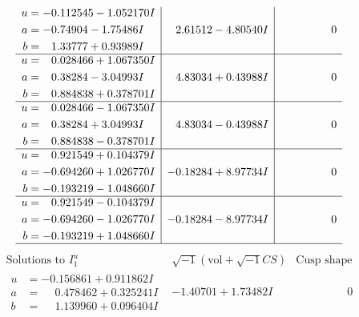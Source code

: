 \documentclass[1p]{elsarticle_modified}
\theoremstyle{definition}
\newcommand{\I}{\sqrt{-1}}
\begin{document}
$$\begin{array}{c|c|c}
\begin{aligned}
u &= -0.112545 - 1.052170 I \\
a &= -0.74904 - 1.75486 I \\
b &= \phantom{-}1.33777 + 0.93989 I\end{aligned}
 & \phantom{-}2.61512 - 4.80540 I & \phantom{-0.000000 } 0 \\ \hline\begin{aligned}
u &= \phantom{-}0.028466 + 1.067350 I \\
a &= \phantom{-}0.38284 - 3.04993 I \\
b &= \phantom{-}0.884838 + 0.378701 I\end{aligned}
 & \phantom{-}4.83034 + 0.43988 I & \phantom{-0.000000 } 0 \\ \hline\begin{aligned}
u &= \phantom{-}0.028466 - 1.067350 I \\
a &= \phantom{-}0.38284 + 3.04993 I \\
b &= \phantom{-}0.884838 - 0.378701 I\end{aligned}
 & \phantom{-}4.83034 - 0.43988 I & \phantom{-0.000000 } 0 \\ \hline\begin{aligned}
u &= \phantom{-}0.921549 + 0.104379 I \\
a &= -0.694260 + 1.026770 I \\
b &= -0.193219 - 1.048660 I\end{aligned}
 & -0.18284 + 8.97734 I & \phantom{-0.000000 } 0 \\ \hline\begin{aligned}
u &= \phantom{-}0.921549 - 0.104379 I \\
a &= -0.694260 - 1.026770 I \\
b &= -0.193219 + 1.048660 I\end{aligned}
 & -0.18284 - 8.97734 I & \phantom{-0.000000 } 0\\
 \hline 
 \end{array}$$\newpage$$\begin{array}{c|c|c}  
\text{Solutions to }I^u_{1}& \I (\text{vol} + \sqrt{-1}CS) & \text{Cusp shape}\\
 \hline 
\begin{aligned}
u &= -0.156861 + 0.911862 I \\
a &= \phantom{-}0.478462 + 0.325241 I \\
b &= \phantom{-}1.139960 + 0.096404 I\end{aligned}
 & -1.40701 + 1.73482 I & \phantom{-0.000000 } 0 \\ \hline\begin{aligned}

\end{aligned}
\end{array}$$
\end{document}
